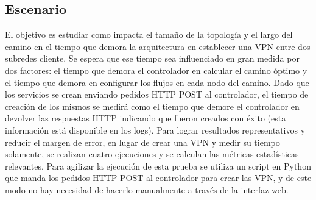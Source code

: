 \subsection{Escenario}
El objetivo es estudiar como impacta el tamaño de la topología y el largo del camino en el tiempo que demora la arquitectura en establecer una VPN entre dos subredes cliente. Se espera que ese tiempo sea influenciado en gran medida por dos factores: el tiempo que demora el controlador en calcular el camino óptimo y el tiempo que demora en configurar los flujos en cada nodo del camino. Dado que los servicios se crean enviando pedidos HTTP POST al controlador, el tiempo de creación de los mismos se medirá como el tiempo que demore el controlador en devolver las respuestas HTTP indicando que fueron creados con éxito (esta información está disponible en los logs). Para lograr resultados representativos y reducir el margen de error, en lugar de crear una VPN y medir su tiempo solamente, se realizan cuatro ejecuciones y se calculan las métricas estadísticas relevantes. Para agilizar la ejecución de esta prueba se utiliza un script en Python que manda los pedidos HTTP POST al controlador para crear las VPN, y de este modo no hay necesidad de hacerlo manualmente a través de la interfaz web.

